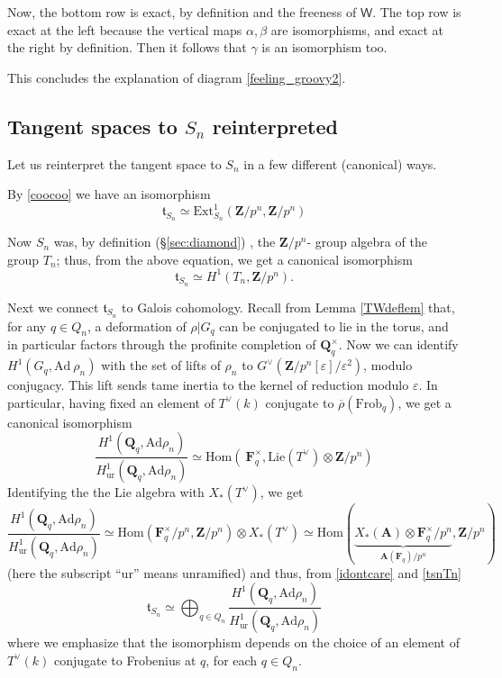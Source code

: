 \documentclass[10pt]{amsart}
\newcommand{\Z}{\mathbf{Z}}
\newcommand{\Ext}{\mathrm{Ext}}
\newcommand{\Winf}{\mathsf{W}}
\newcommand{\Ad}{\mathrm{Ad}}
\newcommand{\Hom}{\mathrm{Hom}}
\newcommand{\ur}{\mathrm{ur}}
\newcommand{\rhobar}{\overline{\rho}}
\newcommand{\Q}{\mathbf{Q}}
\theoremstyle{remark}
\begin{document}
Now, the bottom row is exact, by definition and the freeness of $\Winf$. The top row
is exact at the left because the  vertical maps $\alpha, \beta$ are isomorphisms,
and exact at the right by definition. 
Then it follows that $\gamma$ is an isomorphism too. 

This concludes the explanation of diagram \eqref{feeling_groovy2}.


\subsection{Tangent spaces  to $S_n$ reinterpreted}
Let us reinterpret the tangent space to $S_n$ in a few different  (canonical) ways. 

\label{DDR REF1}


By \eqref{coocoo} we have an isomorphism
%
%
%
%
%
%
%
%
\begin{equation}\label{ExtT} \mathfrak{t}_{S_n} \simeq \Ext^1_{S_n}(\Z/p^n, \Z/p^n)\end{equation} 

Now $S_n$ was, by definition (\S \ref{sec:diamond}) , the $\Z/p^n$- group algebra of the group $T_n$; thus, from the above equation,  we get a canonical isomorphism
\begin{equation} \label{tsnTn}\mathfrak{t}_{S_n} \simeq H^1(T_n, \Z/p^n).\end{equation}
 
 Next we connect $\mathfrak{t}_{S_n}$ to Galois cohomology. Recall from  Lemma \ref{TWdeflem}
  that, for any $q \in Q_n$, a deformation of $\rho|G_{q}$
can be conjugated to lie in the torus, and in particular factors through the profinite completion of $\Q_q^{\times}$. 
Now we can identify $H^1(G_q, \Ad \ \rho_n)$
with the set of lifts  of $\rho_n$ to $G^{\vee}(\Z/p^n[\varepsilon]/\varepsilon^2)$, modulo conjugacy. 
This lift sends tame inertia to the kernel of reduction modulo $\varepsilon$. 
In particular, having fixed an element of $T^{\vee}(k)$ conjugate to $\rhobar(\mathrm{Frob}_q)$, we get a canonical isomorphism 
\begin{equation} \label{TqH} \frac{ H^1(\Q_q, \Ad \rho_n)}{H^1_{\ur}(\Q_q, \Ad \rho_n) } \simeq 
\mathrm{Hom}\left( \ \mathbf{F}_q^{\times},  
\mathrm{Lie}(T^{\vee}) \otimes \Z/p^n\right)\end{equation}
Identifying the the Lie algebra
with $X_*(T^{\vee})$, we get 
\begin{equation}   \label{brst}
 \frac{ H^1(\Q_q, \Ad \rho_n)}{H^1_{\ur}(\Q_q, \Ad \rho_n) }  \simeq \Hom(\mathbf{F}_q^{\times}/p^n,  \Z/p^n) \otimes X_*(T^{\vee})  \simeq \Hom(\underbrace{X_*(\mathbf{A}) \otimes \mathbf{F}_q^{\times}/p^n}_{\mathbf{A}(\mathbf{F}_q)/p^n}, \Z/p^n)\end{equation} 
(here the subscript ``ur'' means unramified) and thus, from \eqref{idontcare} and  \eqref{tsnTn} 
\begin{equation} \label{tSn Galois} \mathfrak{t}_{S_n} \simeq  \bigoplus_{q \in Q_n}  \frac{ H^1(\Q_q, \Ad \rho_n)}{H^1_{\ur}(\Q_q, \Ad \rho_n)} \end{equation} 
where we emphasize that the isomorphism depends on the choice of  an element of $T^{\vee}(k)$ conjugate to Frobenius at $q$, for each $q \in Q_n$. 
 
\end{document}
